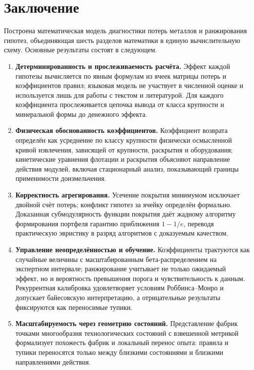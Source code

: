 \documentclass[12pt,a4paper]{article}
\begin{document}
\section{Заключение}

Построена математическая модель диагностики потерь металлов и ранжирования
гипотез, объединяющая шесть разделов математики в единую вычислительную
схему. Основные результаты состоят в следующем.

\begin{enumerate}
  \item \textbf{Детерминированность и прослеживаемость расчёта.}
    Эффект каждой гипотезы вычисляется по явным формулам из ячеек матрицы
    потерь и коэффициентов правил; языковая модель не участвует в численной
    оценке и используется лишь для работы с текстом и литературой.
    Для каждого коэффициента прослеживается цепочка вывода от класса
    крупности и минеральной формы до денежного эффекта.
  \item \textbf{Физическая обоснованность коэффициентов.}
    Коэффициент возврата определён как усреднение по классу крупности
    физически осмысленной кривой извлечения, зависящей от крупности,
    раскрытия и оборудования; кинетические уравнения флотации и раскрытия
    объясняют направление действия модулей, включая стационарный анализ,
    показывающий границы применимости доизмельчения.
  \item \textbf{Корректность агрегирования.}
    Усечение покрытия минимумом исключает двойной счёт потерь; конфликт
    гипотез за ячейку определён формально. Доказанная субмодулярность
    функции покрытия даёт жадному алгоритму формирования портфеля гарантию
    приближения \(1-1/e\), переводя практическую эвристику в разряд
    алгоритмов с доказуемым качеством.
  \item \textbf{Управление неопределённостью и обучение.}
    Коэффициенты трактуются как случайные величины с масштабированным
    бета-распределением на экспертном интервале; ранжирование учитывает
    не только ожидаемый эффект, но и вероятность превышения порога и
    чувствительность к данным. Рекуррентная калибровка удовлетворяет
    условиям Роббинса--Монро и допускает байесовскую интерпретацию,
    а отрицательные результаты фиксируются как переносимые тупики.
  \item \textbf{Масштабируемость через геометрию состояний.}
    Представление фабрик точками многообразия технологических состояний
    с взвешенной метрикой формализует похожесть фабрик и локальный перенос
    опыта: правила и тупики переносятся только между близкими состояниями
    и близкими направлениями действия.
\end{enumerate}
\end{document}
